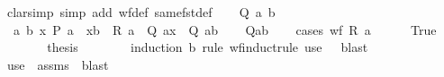 \begin{isabellebody}
%
\isadelimproof
%
\endisadelimproof
%
\isatagproof
{}\isamarkupfalse%
\ {\isacharparenleft}{\kern0pt}clarsimp\ simp\ add{\isacharcolon}{\kern0pt}\ wf{\isacharunderscore}{\kern0pt}def\ same{\isacharunderscore}{\kern0pt}fst{\isacharunderscore}{\kern0pt}def{\isacharparenright}{\kern0pt}\isanewline
\ \ \isamarkupfalse%
\ Q\ a\ b\isanewline
\ \ \isamarkupfalse%
\ {\isacharasterisk}{\kern0pt}{\isacharcolon}{\kern0pt}\ {\isachardoublequoteopen}{\isasymforall}a\ b{\isachardot}{\kern0pt}\ {\isacharparenleft}{\kern0pt}{\isasymforall}x{\isachardot}{\kern0pt}\ P\ a\ {\isasymand}\ {\isacharparenleft}{\kern0pt}x{\isacharcomma}{\kern0pt}b{\isacharparenright}{\kern0pt}\ {\isasymin}\ R\ a\ {\isasymlongrightarrow}\ Q\ {\isacharparenleft}{\kern0pt}a{\isacharcomma}{\kern0pt}x{\isacharparenright}{\kern0pt}{\isacharparenright}{\kern0pt}\ {\isasymlongrightarrow}\ Q\ {\isacharparenleft}{\kern0pt}a{\isacharcomma}{\kern0pt}b{\isacharparenright}{\kern0pt}{\isachardoublequoteclose}\isanewline
\ \ \isamarkupfalse%
\ {\isachardoublequoteopen}Q{\isacharparenleft}{\kern0pt}a{\isacharcomma}{\kern0pt}b{\isacharparenright}{\kern0pt}{\isachardoublequoteclose}\isanewline
\ \ \isamarkupfalse%
\ {\isacharparenleft}{\kern0pt}cases\ {\isachardoublequoteopen}wf\ {\isacharparenleft}{\kern0pt}R\ a{\isacharparenright}{\kern0pt}{\isachardoublequoteclose}{\isacharparenright}{\kern0pt}\isanewline
\ \ \ \ \isamarkupfalse%
\ True\isanewline
\ \ \ \ \isamarkupfalse%
\ \isamarkupfalse%
\ {\isacharquery}{\kern0pt}thesis\isanewline
\ \ \ \ \ \ \isamarkupfalse%
\ {\isacharparenleft}{\kern0pt}induction\ b\ rule{\isacharcolon}{\kern0pt}\ wf{\isacharunderscore}{\kern0pt}induct{\isacharunderscore}{\kern0pt}rule{\isacharparenright}{\kern0pt}\ {\isacharparenleft}{\kern0pt}use\ {\isacharasterisk}{\kern0pt}\ \ blast{\isacharparenright}{\kern0pt}\isanewline
\ \ \isamarkupfalse%
\ {\isacharparenleft}{\kern0pt}use\ {\isacharasterisk}{\kern0pt}\ assms\ \ blast{\isacharparenright}{\kern0pt}\isanewline
{}\isamarkupfalse%
%
\endisatagproof
{\isafoldproof}%
%
\isadelimproof
\isanewline
%
\endisadelimproof
%
\isadelimtheory
\isanewline
%
\endisadelimtheory
%
\isatagtheory
{}\isamarkupfalse%
%
\endisatagtheory
{\isafoldtheory}%
%
\isadelimtheory
%
\endisadelimtheory
%
\end{isabellebody}%
\endinput
